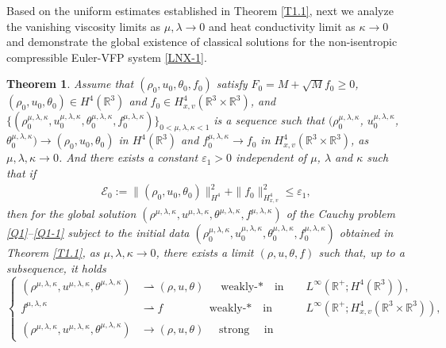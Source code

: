 \documentclass[reqno,11pt]{amsart}
\theoremstyle{plain}
\newtheorem{thm}{Theorem}[section]
\numberwithin{equation}{section}
\newcommand{\eps}{{\varepsilon}}
\begin{document}
Based on  the uniform estimates established in Theorem \ref{T1.1}, next we analyze 
the vanishing viscosity limits
as $\mu,\lambda\rightarrow0$ and
  heat conductivity limit as $\kappa \to 0$ and demonstrate the global existence of 
  classical solutions for the non-isentropic compressible Euler-VFP system \eqref{LNX-1}. 



\begin{thm}\label{T1.2}
Assume that $(\rho_0 ,u_0 ,\theta_0,f_0)$
satisfy $F_0=M+\sqrt{M}f_0\geq 0$, $(\rho_0,u_0,\theta_0)\in H^4(\mathbb{R}^3)$
and $f_0\in H_{x,v}^4(\mathbb{R}^3\times\mathbb{R}^3)$, and $\{(\rho_0^{\mu,\lambda,\kappa},
u_0^{\mu,\lambda,\kappa},\theta_0^{\mu,\lambda,\kappa},f_0^{\mu,\lambda,\kappa})\}_{0<\mu,\lambda,\kappa<1}$ is
a sequence such that $(\rho^{\mu,\lambda,\kappa}_0$, $u^{\mu,\lambda,\kappa}_0 $, 
$\theta^{\mu,\lambda,\kappa}_0) \rightarrow (\rho_0,u_0,\theta_0)$ in 
$H^4(\mathbb{R}^3)$ and $f_0^{\mu,\lambda,\kappa}\rightarrow f_0$ in
$H^4_{x,v}(\mathbb{R}^3\times\mathbb{R}^3)$, as $\mu,\lambda,\kappa \rightarrow 0$.
 And there exists a constant $\eps_1>0$
independent of $\mu$, $\lambda$ and $\kappa$ such that if
\begin{align}\label{b-1}
\mathcal{E}_0:=\|(\rho _0,u _0,\theta _0 )\|_{H^4}^2+\|f_0 \|_{H_{x,v}^4}^2\leq \eps_1,
\end{align}
then for the global solution $(\rho^{\mu,\lambda,\kappa},u^{\mu,\lambda,\kappa},
\theta^{\mu,\lambda,\kappa},f^{\mu,\lambda,\kappa})$ of the Cauchy problem 
\eqref{Q1}--\eqref{Q1-1} subject to the initial data  $(\rho_0^{\mu,\lambda,\kappa},
u_0^{\mu,\lambda,\kappa},\theta_0^{\mu,\lambda,\kappa},f_0^{\mu,\lambda,\kappa})$ 
obtained in Theorem \ref{T1.1}, as $\mu,\lambda,\kappa\rightarrow 0$,
there exists a limit $(\rho,u,\theta,f)$ such that, up to a subsequence, it holds 
\begin{equation}\label{b2}
\left\{
\begin{aligned}
(\rho^{\mu,\lambda,\kappa},u^{\mu,\lambda,\kappa},\theta^{\mu,\lambda,\kappa}) 
&\rightharpoonup (\rho,u,\theta )\quad  \,\, \text{weakly-$*$~  ~in ~~~} 
&& L^{\infty}(\mathbb{R}^{+};H^4(\mathbb{R}^3)),\\
f^{\mu,\lambda,\kappa} &\rightharpoonup  f\quad  \,\, \quad\quad\,\,\,\, 
\text{weakly-$*$~ ~in ~~~} &&L^{\infty}(\mathbb{R}^{+};H_{x,v}^4(\mathbb{R}^3\times\mathbb{R}^3)),\\
(\rho^{\mu,\lambda,\kappa},u^{\mu,\lambda,\kappa},\theta^{\mu,\lambda,\kappa} ) 
&\rightarrow (\rho,u,\theta )\quad  \,\, \text{strong ~~  in ~~~} 

\end{aligned}
\end{equation}
\end{thm}
\end{document}
